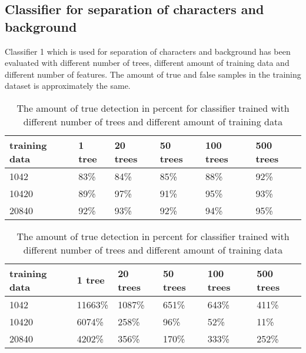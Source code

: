\subsection{Classifier for separation of characters and background}
\label{sec:Classifier for separation of characters and background}
Classifier 1 which is used for separation of characters and background has been evaluated with different number of trees, different amount of training data and different number of features. The amount of true and false samples in the training dataset is approximately the same.

\begin{table}[H]
\begin{center}
     \begin{tabular}{| l | l | l | l | l | l | }
     \hline
     training data & 1 tree & 20 trees & 50 trees & 100 trees & 500 trees \\ \hline
     1042 & 83\% & 84\% & 85\% & 88\% & 92\% 		\\ \hline
   	 10420 & 89\% & 97\% & 91\% & 95\% & 93\%  	\\ \hline
     20840 & 92\% & 93\% & 92\% & 94\% & 95\% 		\\ \hline

     \end{tabular}
\end{center}
\caption{The amount of true detection in percent for classifier trained with different number of trees and different amount of training data}
\end{table}

\begin{table}[H]
\begin{center}
     \begin{tabular}{| l | l | l | l | l | l | }
     \hline
     training data & 1 tree & 20 trees & 50 trees & 100 trees & 500 trees \\ \hline
     1042 & 11663\% & 1087\% & 651\% & 643\% & 411\% 		\\ \hline
   	 10420 & 6074\% & 258\% & 96\% & 52\% & 11\%  	\\ \hline
     20840 & 4202\% & 356\% & 170\% & 333\% & 252\% 		\\ \hline

     \end{tabular}
\end{center}
\caption{The amount of true detection in percent for classifier trained with different number of trees and different amount of training data}
\end{table}

